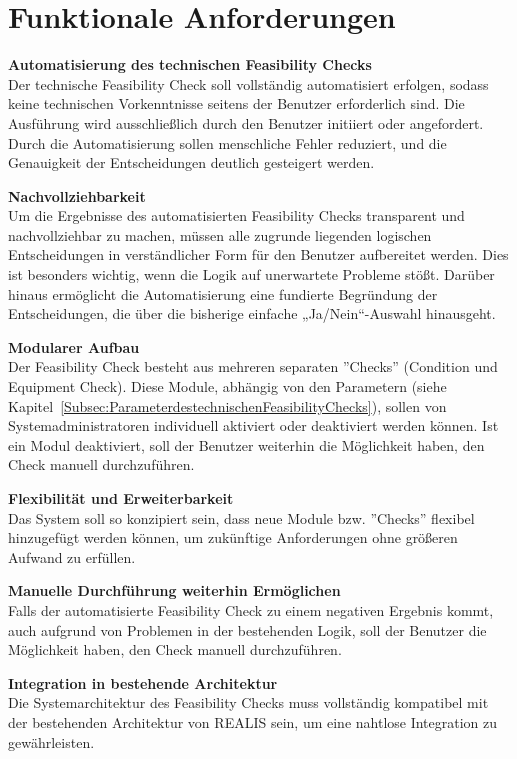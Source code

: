 \section{Funktionale Anforderungen}

\setlength{\leftskip}{1em} 
\textbf{Automatisierung des technischen Feasibility Checks}  \\
Der technische Feasibility Check soll vollständig automatisiert erfolgen, sodass keine technischen Vorkenntnisse seitens der Benutzer erforderlich sind. Die Ausführung wird ausschließlich durch den Benutzer initiiert oder angefordert. Durch die Automatisierung sollen menschliche Fehler reduziert, und die Genauigkeit der Entscheidungen deutlich gesteigert werden.

\textbf{Nachvollziehbarkeit}  \\
Um die Ergebnisse des automatisierten Feasibility Checks transparent und nachvollziehbar zu machen, müssen alle zugrunde liegenden logischen Entscheidungen in verständlicher Form für den Benutzer aufbereitet werden. Dies ist besonders wichtig, wenn die Logik auf unerwartete Probleme stößt. Darüber hinaus ermöglicht die Automatisierung eine fundierte Begründung der Entscheidungen, die über die bisherige einfache „Ja/Nein“-Auswahl hinausgeht.

\textbf{Modularer Aufbau}  \\
Der Feasibility Check besteht aus mehreren separaten ''Checks'' (Condition und Equipment Check). Diese Module, abhängig von den Parametern (siehe Kapitel~\ref{Subsec:ParameterdestechnischenFeasibilityChecks}), sollen von Systemadministratoren individuell aktiviert oder deaktiviert werden können. Ist ein Modul deaktiviert, soll der Benutzer weiterhin die Möglichkeit haben, den Check manuell durchzuführen.

\textbf{Flexibilität und Erweiterbarkeit}  \\
Das System soll so konzipiert sein, dass neue Module bzw. ''Checks'' flexibel hinzugefügt werden können, um zukünftige Anforderungen ohne größeren Aufwand zu erfüllen.

\textbf{Manuelle Durchführung weiterhin Ermöglichen}  \\
Falls der automatisierte Feasibility Check zu einem negativen Ergebnis kommt, auch aufgrund von Problemen in der bestehenden Logik, soll der Benutzer die Möglichkeit haben, den Check manuell durchzuführen.

\textbf{Integration in bestehende Architektur}  \\
Die Systemarchitektur des Feasibility Checks muss vollständig kompatibel mit der bestehenden Architektur von \gls{REALIS} sein, um eine nahtlose Integration zu gewährleisten.

\setlength{\leftskip}{0em} 
